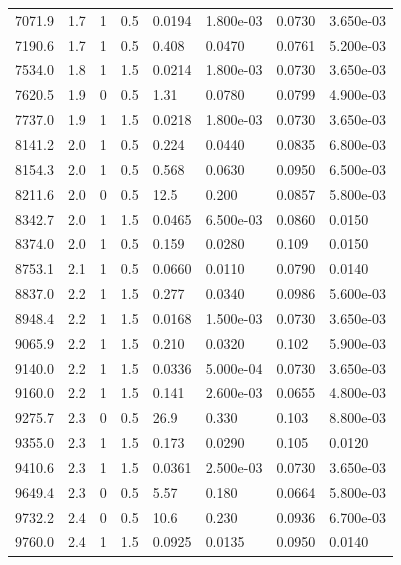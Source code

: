 \documentclass[preview]{standalone}
\begin{document}
{{{\begin{tabular}{L{1.2cm}C{1.2cm} C{0.3cm}C{0.5cm} C{1.4cm}C{1.4cm} C{1.4cm}C{1.4cm}}
  7071.9  &   1.7  & 1     & 0.5 &  0.0194  & 1.800e-03  & 0.0730 &  3.650e-03   \\ 
  7190.6  &   1.7  & 1     & 0.5 &  0.408  & 0.0470  & 0.0761 &  5.200e-03   \\ 
  7534.0  &   1.8  & 1     & 1.5 &  0.0214  & 1.800e-03  & 0.0730 &  3.650e-03   \\ 
  7620.5  &   1.9  & 0     & 0.5 &  1.31  & 0.0780  & 0.0799 &  4.900e-03   \\ 
  7737.0  &   1.9  & 1     & 1.5 &  0.0218  & 1.800e-03  & 0.0730 &  3.650e-03   \\ 
  8141.2  &   2.0  & 1     & 0.5 &  0.224  & 0.0440  & 0.0835 &  6.800e-03   \\ 
  8154.3  &   2.0  & 1     & 0.5 &  0.568  & 0.0630  & 0.0950 &  6.500e-03   \\ 
  8211.6  &   2.0  & 0     & 0.5 &  12.5  & 0.200  & 0.0857 &  5.800e-03   \\ 
  8342.7  &   2.0  & 1     & 1.5 &  0.0465  & 6.500e-03  & 0.0860 &  0.0150   \\ 
  8374.0  &   2.0  & 1     & 0.5 &  0.159  & 0.0280  & 0.109 &  0.0150   \\ 
  8753.1  &   2.1  & 1     & 0.5 &  0.0660  & 0.0110  & 0.0790 &  0.0140   \\ 
  8837.0  &   2.2  & 1     & 1.5 &  0.277  & 0.0340  & 0.0986 &  5.600e-03   \\ 
  8948.4  &   2.2  & 1     & 1.5 &  0.0168  & 1.500e-03  & 0.0730 &  3.650e-03   \\ 
  9065.9  &   2.2  & 1     & 1.5 &  0.210  & 0.0320  & 0.102 &  5.900e-03   \\ 
  9140.0  &   2.2  & 1     & 1.5 &  0.0336  & 5.000e-04  & 0.0730 &  3.650e-03   \\ 
  9160.0  &   2.2  & 1     & 1.5 &  0.141  & 2.600e-03  & 0.0655 &  4.800e-03   \\ 
  9275.7  &   2.3  & 0     & 0.5 &  26.9  & 0.330  & 0.103 &  8.800e-03   \\ 
  9355.0  &   2.3  & 1     & 1.5 &  0.173  & 0.0290  & 0.105 &  0.0120   \\ 
  9410.6  &   2.3  & 1     & 1.5 &  0.0361  & 2.500e-03  & 0.0730 &  3.650e-03   \\ 
  9649.4  &   2.3  & 0     & 0.5 &  5.57  & 0.180  & 0.0664 &  5.800e-03   \\ 
  9732.2  &   2.4  & 0     & 0.5 &  10.6  & 0.230  & 0.0936 &  6.700e-03   \\ 
  9760.0  &   2.4  & 1     & 1.5 &  0.0925  & 0.0135  & 0.0950 &  0.0140   \\ 

\end{tabular}}}}
\end{document}
